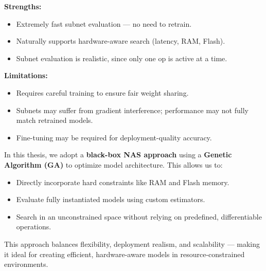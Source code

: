 \textbf{Strengths:}
\begin{itemize}
    \item Extremely fast subnet evaluation — no need to retrain.
    \item Naturally supports hardware-aware search (latency, RAM, Flash).
    \item Subnet evaluation is realistic, since only one op is active at a time.
\end{itemize}

\textbf{Limitations:}
\begin{itemize}
    \item Requires careful training to ensure fair weight sharing.
    \item Subnets may suffer from gradient interference; performance may not fully match retrained models.
    \item Fine-tuning may be required for deployment-quality accuracy.
\end{itemize}


\begin{comment}
\subsection{Summary and Thesis Direction}
Black-box NAS offers maximum flexibility and supports arbitrary performance constraints, but suffers from high computational cost. DARTS introduces differentiability to reduce this cost but trades off flexibility and realism. Supernet-based methods strike a middle ground, enabling efficient and hardware-aware search through weight sharing and path sampling.
\end{comment}

\vspace{0.3em}
\noindent In this thesis, we adopt a \textbf{black-box NAS approach} using a \textbf{Genetic Algorithm (GA)} to optimize model architecture. This allows us to:
\begin{itemize}
    \item Directly incorporate hard constraints like RAM and Flash memory.
    \item Evaluate fully instantiated models using custom estimators.
    \item Search in an unconstrained space without relying on predefined, differentiable operations.
\end{itemize}

This approach balances flexibility, deployment realism, and scalability — making it ideal for creating efficient, hardware-aware models in resource-constrained environments.














